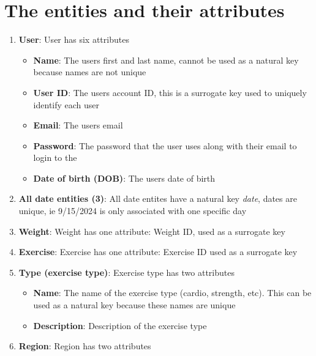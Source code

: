 \documentclass{report}
\begin{document}
    \pagebreak 
    \bigbreak \noindent 
    \section{The entities and their attributes}
    \bigbreak \noindent 
    \bigbreak \noindent 
    \begin{enumerate}
        \item \textbf{User}: User has six attributes
            \begin{itemize}
                \item \textbf{Name}: The users first and last name, cannot be used as a natural key because names are not unique
                \item \textbf{User ID}: The users account ID, this is a surrogate key used to uniquely identify each user
                \item \textbf{Email}: The users email 
                \item \textbf{Password}: The password that the user uses along with their email to login to the \approx 
                \item \textbf{Date of birth (DOB)}: The users date of birth 
            \end{itemize}
        \item \textbf{All date entities (3)}: All date entites have a natural key \textit{date}, dates are unique, ie 9/15/2024 is only associated with one specific day
        \item \textbf{Weight}: Weight has one attribute: Weight ID, used as a surrogate key
        \item \textbf{Exercise}: Exercise has one attribute: Exercise ID used as a surrogate key
        \item \textbf{Type (exercise type)}: Exercise type has two attributes
            \begin{itemize}
                \item \textbf{Name}: The name of the exercise type (cardio, strength, etc). This can be used as a natural key because these names are unique
                \item \textbf{Description}: Description of the exercise type
            \end{itemize}
        \item \textbf{Region}: Region has two attributes
            \begin{itemize}

\end{itemize}
\end{enumerate}
\end{document}
